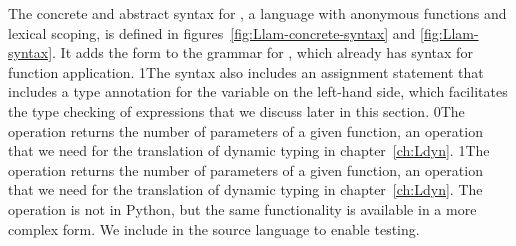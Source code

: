 \documentclass[7x10]{TimesAPriori_MIT}%
\def\racketEd{0}
\def\pythonEd{1}
\def\edition{0}
\newcommand{\racket}[1]{{\if\edition\racketEd{#1}\fi}}
\newcommand{\python}[1]{{\if\edition\pythonEd #1\fi}}
\numberwithin{theorem}{chapter}
\numberwithin{definition}{chapter}
\numberwithin{equation}{chapter}
\begin{document}
The concrete and abstract syntax for \LangLam{}, a language with anonymous
functions and lexical scoping, is defined in
figures~\ref{fig:Llam-concrete-syntax} and \ref{fig:Llam-syntax}. It adds
the  form to the grammar for \LangFun{}, which already has
syntax for function application. 
%
\python{The syntax also includes an assignment statement that includes
  a type annotation for the variable on the left-hand side, which
  facilitates the type checking of \code{lambda} expressions that we
  discuss later in this section.}
%
\racket{The  operation returns the number of parameters
  of a given function, an operation that we need for the translation
  of dynamic typing in chapter~\ref{ch:Ldyn}.}
%
\python{The  operation returns the number of parameters of
  a given function, an operation that we need for the translation
  of dynamic typing in chapter~\ref{ch:Ldyn}.
  The \code{arity} operation is not in Python, but the same functionality
  is available in a more complex form. We include \code{arity} in the
  \LangLam{} source language to enable testing.}

\newcommand{\LlambdaGrammarRacket}{
  \begin{array}{lcl}
  \Exp &::=&  \CLAMBDA{\LP\LS\Var \key{:} \Type\RS\ldots\RP}{\Type}{\Exp} \\
    &\MID& \LP \key{procedure-arity}~\Exp\RP
  \end{array}
}
\newcommand{\LlambdaASTRacket}{
  \begin{array}{lcl}
  \Exp &::=& \LAMBDA{\LP\LS\Var\code{:}\Type\RS\ldots\RP}{\Type}{\Exp}\\
  \itm{op} &::=& \code{procedure-arity} 
  \end{array}
}

\newcommand{\LlambdaGrammarPython}{
  \begin{array}{lcl}
  \Exp &::=& \CLAMBDA{\Var\code{, }\ldots}{\Exp} \MID \CARITY{\Exp} \\
  \Stmt &::=& \CANNASSIGN{\Var}{\Type}{\Exp}
  \end{array}
}

\newcommand{\LlambdaASTPython}{
  \begin{array}{lcl}
  \Exp &::=& \LAMBDA{\Var^{*}}{\Exp} \MID \ARITY{\Exp} \\
  \Stmt &::=& \ANNASSIGN{\Var}{\Type}{\Exp}
  \end{array}
}


\end{document}

